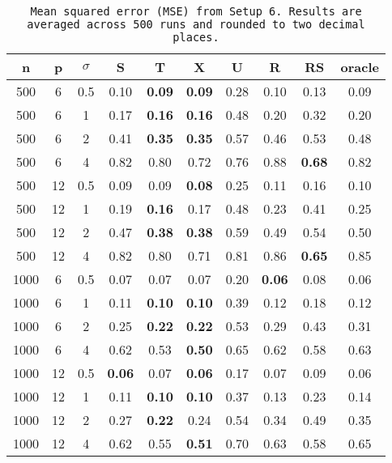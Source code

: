 \begin{table}[ht]
\centering
\begin{tabular}{cccccccccc}
  \hline
n & p & $\sigma$ & S & T & X & U & R & RS & oracle \\ 
  \hline
500 & 6 & 0.5 & 0.10 & \bf 0.09 & \bf 0.09 &  0.28 & 0.10 & 0.13 & 0.09 \\ 
  500 & 6 & 1 & 0.17 & \bf 0.16 & \bf 0.16 &  0.48 & 0.20 & 0.32 & 0.20 \\ 
  500 & 6 & 2 & 0.41 & \bf 0.35 & \bf 0.35 &  0.57 & 0.46 & 0.53 & 0.48 \\ 
  500 & 6 & 4 & 0.82 & 0.80 & 0.72 &  0.76 & 0.88 & \bf 0.68 & 0.82 \\ 
  500 & 12 & 0.5 & 0.09 & 0.09 & \bf 0.08 &  0.25 & 0.11 & 0.16 & 0.10 \\ 
  500 & 12 & 1 & 0.19 & \bf 0.16 & 0.17 &  0.48 & 0.23 & 0.41 & 0.25 \\ 
  500 & 12 & 2 & 0.47 & \bf 0.38 & \bf 0.38 &  0.59 & 0.49 & 0.54 & 0.50 \\ 
  500 & 12 & 4 & 0.82 & 0.80 & 0.71 &  0.81 & 0.86 & \bf 0.65 & 0.85 \\ 
  1000 & 6 & 0.5 & 0.07 & 0.07 & 0.07 &  0.20 & \bf 0.06 & 0.08 & 0.06 \\ 
  1000 & 6 & 1 & 0.11 & \bf 0.10 & \bf 0.10 &  0.39 & 0.12 & 0.18 & 0.12 \\ 
  1000 & 6 & 2 & 0.25 & \bf 0.22 & \bf 0.22 &  0.53 & 0.29 & 0.43 & 0.31 \\ 
  1000 & 6 & 4 & 0.62 & 0.53 & \bf 0.50 &  0.65 & 0.62 & 0.58 & 0.63 \\ 
  1000 & 12 & 0.5 & \bf 0.06 & 0.07 & \bf 0.06 &  0.17 & 0.07 & 0.09 & 0.06 \\ 
  1000 & 12 & 1 & 0.11 & \bf 0.10 & \bf 0.10 &  0.37 & 0.13 & 0.23 & 0.14 \\ 
  1000 & 12 & 2 & 0.27 & \bf 0.22 & 0.24 &  0.54 & 0.34 & 0.49 & 0.35 \\ 
  1000 & 12 & 4 & 0.62 & 0.55 & \bf 0.51 &  0.70 & 0.63 & 0.58 & 0.65 \\ 
   \hline
\end{tabular}
\caption{\tt Mean squared error (MSE) from Setup 6. Results are averaged across 500 runs and rounded to two decimal places.} 
\label{table:setup6}
\end{table}
